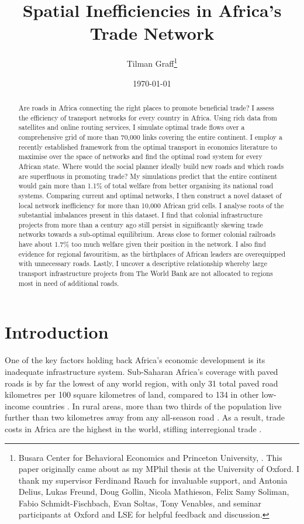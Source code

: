 \documentclass[11pt, oneside]{article}   	%
\title{Spatial Inefficiencies in Africa's Trade Network}
\author{Tilman Graff\thanks{Busara Center for Behavioral Economics and Princeton University, \href{mailto:tgraff@princeton.edu}{\UrlFont{tgraff@princeton.edu}}. This paper originally came about as my MPhil thesis at the University of Oxford. I thank my supervisor Ferdinand Rauch for invaluable support, and Antonia Delius, Lukas Freund, Doug Gollin, Nicola Mathieson, Felix Samy Soliman, Fabio Schmidt-Fischbach, Evan Soltas, Tony Venables, and seminar participants at Oxford and LSE for helpful feedback and discussion.}}
\date{\today}
\begin{document}


\maketitle

\begin{abstract}
  Are roads in Africa connecting the right places to promote beneficial trade? I assess the efficiency of transport networks for every country in Africa. Using rich data from satellites and online routing services, I simulate optimal trade flows over a comprehensive grid of more than 70,000 links covering the entire continent. I employ a recently established framework from the optimal transport in economics literature to maximise over the space of networks and find the optimal road system for every African state. Where would the social planner ideally build new roads and which roads are superfluous in promoting trade? My simulations predict that the entire continent would gain more than 1.1\% of total welfare from better organising its national road systems. Comparing current and optimal networks, I then construct a novel dataset of local network inefficiency for more than 10,000 African grid cells. I analyse roots of the substantial imbalances present in this dataset. I find that colonial infrastructure projects from more than a century ago still persist in significantly skewing trade networks towards a sub-optimal equilibrium. Areas close to former colonial railroads have about 1.7\% too much welfare given their position in the network. I also find evidence for regional favouritism, as the birthplaces of African leaders are overequipped with unnecessary roads. Lastly, I uncover a descriptive relationship whereby large transport infrastructure projects from The World Bank are not allocated to regions most in need of additional roads.
\end{abstract}

\newpage



\section{Introduction}
One of the key factors holding back Africa's economic development is its inadequate infrastructure system. Sub-Saharan Africa's coverage with paved roads is by far the lowest of any world region, with only 31 total paved road kilometres per 100 square kilometres of land, compared to 134 in other low-income countries \citep{Foster_AfricaInfrastructureTime_2010}. In rural areas, more than two thirds of the population live further than two kilometres away from any all-season road \citep{Teravaninthorn_TransportPricesCosts_2009}. As a result, trade costs in Africa are the highest in the world, stifling interregional trade \citep{Limao_InfrastructureGeographicalDisadvantage_2001,Foster_AfricaInfrastructureTime_2010,TheEconomist_All_2015}.
\end{document}
